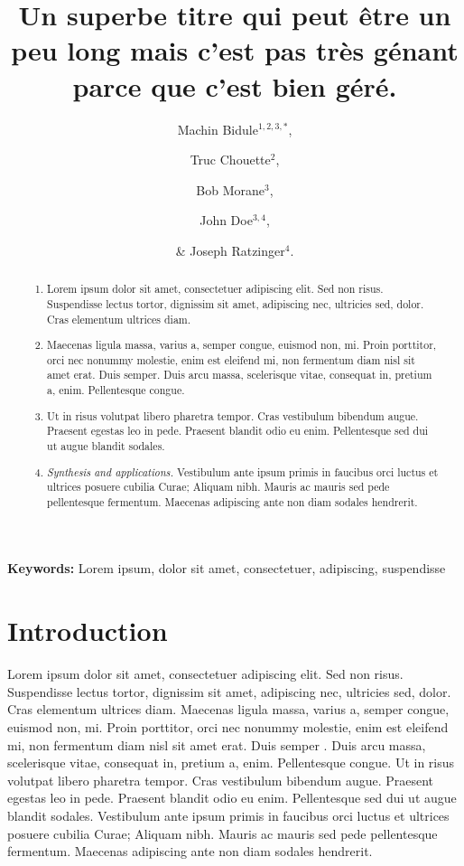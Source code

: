 \documentclass[a4paper,12pt]{article}
\title{Un superbe titre qui peut être un peu long mais c'est pas très génant parce que
  c'est bien géré.}
\author{Machin Bidule$^{1,2,3,*}$, \and Truc Chouette$^{2}$, \and Bob Morane$^{3}$, \and
  John Doe$^{3,4}$, \and \& Joseph Ratzinger$^{4}$.}
\begin{document}
\maketitle


\begin{abstract}
  \noindent \begin{enumerate}
  \item Lorem ipsum dolor sit amet, consectetuer adipiscing elit. Sed non
    risus. Suspendisse lectus tortor, dignissim sit amet, adipiscing nec, ultricies sed,
    dolor. Cras elementum ultrices diam.
  \item Maecenas ligula massa, varius a, semper congue, euismod non, mi. Proin porttitor,
    orci nec nonummy molestie, enim est eleifend mi, non fermentum diam nisl sit amet
    erat. Duis semper. Duis arcu massa, scelerisque vitae, consequat in, pretium a,
    enim. Pellentesque congue.
  \item Ut in risus volutpat libero pharetra tempor. Cras vestibulum bibendum
    augue. Praesent egestas leo in pede. Praesent blandit odio eu enim. Pellentesque sed
    dui ut augue blandit sodales.
  \item \emph{Synthesis and applications.} Vestibulum ante ipsum primis in faucibus orci
    luctus et ultrices posuere cubilia Curae; Aliquam nibh. Mauris ac mauris sed pede
    pellentesque fermentum. Maecenas adipiscing ante non diam sodales hendrerit.
  \end{enumerate}
\end{abstract}

\noindent \textbf{Keywords:} Lorem ipsum, dolor sit amet, consectetuer, adipiscing,
suspendisse



\newpage


\section*{Introduction}

Lorem ipsum dolor sit amet, consectetuer adipiscing elit. Sed non risus. Suspendisse
lectus tortor, dignissim sit amet, adipiscing nec, ultricies sed, dolor. Cras elementum
ultrices diam. Maecenas ligula massa, varius a, semper congue, euismod non, mi. Proin
porttitor, orci nec nonummy molestie, enim est eleifend mi, non fermentum diam nisl sit
amet erat. Duis semper \citep{Bivand_2007,Broeseth_2007_REP}. Duis arcu massa, scelerisque
vitae, consequat in, pretium a, enim. Pellentesque congue. Ut in risus volutpat libero
pharetra tempor. Cras vestibulum bibendum augue. Praesent egestas leo in pede. Praesent
blandit odio eu enim. Pellentesque sed dui ut augue blandit sodales. Vestibulum ante ipsum
primis in faucibus orci luctus et ultrices posuere cubilia Curae; Aliquam nibh. Mauris ac
mauris sed pede pellentesque fermentum. Maecenas adipiscing ante non diam sodales
hendrerit.
\end{document}
